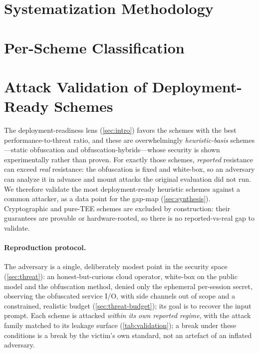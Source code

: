 \section{Systematization Methodology}
\label{app:method}

\section{Per-Scheme Classification}
\label{app:classification}

\section{Attack Validation of Deployment-Ready Schemes}
\label{app:validation}
The deployment-readiness lens (\cref{sec:intro}) favors the schemes with the best
performance-to-threat ratio, and these are overwhelmingly \emph{heuristic-basis} schemes---static
obfuscation and obfuscation-hybrids---whose security is shown experimentally rather than proven.
For exactly those schemes, \emph{reported} resistance can exceed \emph{real} resistance: the
obfuscation is fixed and white-box, so an adversary can analyze it in advance and mount attacks
the original evaluation did not run. We therefore validate the most deployment-ready heuristic
schemes against a common attacker, as a data point for the gap-map (\cref{sec:synthesis}).
Cryptographic and pure-TEE schemes are excluded by construction: their guarantees are provable or
hardware-rooted, so there is no reported-vs-real gap to validate.

\paragraph{Reproduction protocol.} The adversary is a single, deliberately modest point in the
security space (\cref{sec:threat}): an honest-but-curious cloud operator, white-box on the public
model and the obfuscation method, denied only the ephemeral per-session secret, observing the
obfuscated service I/O, with side channels out of scope and a constrained, realistic budget
(\cref{sec:threat-budget}); its goal is to recover the input prompt. Each scheme is attacked
\emph{within its own reported regime}, with the attack family matched to its leakage surface
(\cref{tab:validation}); a break under these conditions is a break by the victim's own standard,
not an artefact of an inflated adversary.

